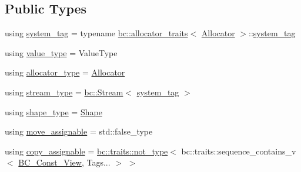 \subsection*{Public Types}
\begin{DoxyCompactItemize}
\item 
using \hyperlink{classbc_1_1tensors_1_1exprs_1_1Array__Slice_a24a53456bc1a4bf93b7d37df3fb053fb}{system\+\_\+tag} = typename \hyperlink{structbc_1_1allocators_1_1allocator__traits}{bc\+::allocator\+\_\+traits}$<$ \hyperlink{classbc_1_1allocators_1_1Allocator}{Allocator} $>$\+::\hyperlink{classbc_1_1tensors_1_1exprs_1_1Array__Slice_a24a53456bc1a4bf93b7d37df3fb053fb}{system\+\_\+tag}
\item 
using \hyperlink{classbc_1_1tensors_1_1exprs_1_1Array__Slice_a36743c3a0824cf194998da96bbb95e47}{value\+\_\+type} = Value\+Type
\item 
using \hyperlink{classbc_1_1tensors_1_1exprs_1_1Array__Slice_a54761123998b091676d1b0deef26d376}{allocator\+\_\+type} = \hyperlink{classbc_1_1allocators_1_1Allocator}{Allocator}
\item 
using \hyperlink{classbc_1_1tensors_1_1exprs_1_1Array__Slice_a73ab693dcce17b3bf37747b2e91a2fb2}{stream\+\_\+type} = \hyperlink{classbc_1_1streams_1_1Stream}{bc\+::\+Stream}$<$ \hyperlink{classbc_1_1tensors_1_1exprs_1_1Array__Slice_a24a53456bc1a4bf93b7d37df3fb053fb}{system\+\_\+tag} $>$
\item 
using \hyperlink{classbc_1_1tensors_1_1exprs_1_1Array__Slice_a32cb548eb3216c642a3a1f45e8b44919}{shape\+\_\+type} = \hyperlink{structbc_1_1Shape}{Shape}
\item 
using \hyperlink{classbc_1_1tensors_1_1exprs_1_1Array__Slice_a3cf7241b4d83d7821c9e11ee5c22e570}{move\+\_\+assignable} = std\+::false\+\_\+type
\item 
using \hyperlink{classbc_1_1tensors_1_1exprs_1_1Array__Slice_a508429be1379f64010846460aef9a4bc}{copy\+\_\+assignable} = \hyperlink{namespacebc_1_1traits_a27454511d91930df60d099d9afdf46ff}{bc\+::traits\+::not\+\_\+type}$<$ bc\+::traits\+::sequence\+\_\+contains\+\_\+v$<$ \hyperlink{classbc_1_1tensors_1_1exprs_1_1BC__Const__View}{B\+C\+\_\+\+Const\+\_\+\+View}, Tags... $>$ $>$
\end{DoxyCompactItemize}
